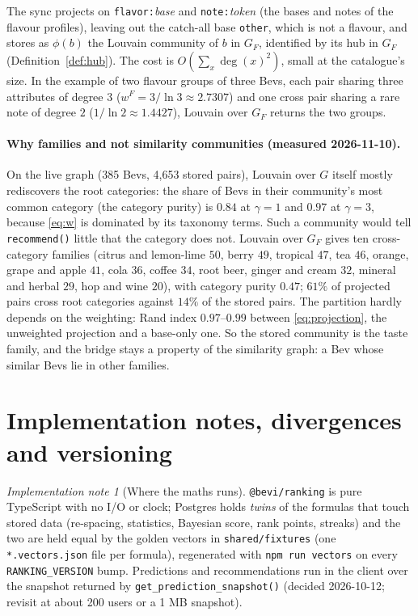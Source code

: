 \documentclass[11pt]{article}
\newcommand{\code}[1]{\texttt{#1}}
\theoremstyle{plain}
\theoremstyle{definition}
\theoremstyle{remark}
\newtheorem{implnote}[theorem]{Implementation note}
\begin{document}
The sync projects on \code{flavor:}\textit{base} and \code{note:}\textit{token} (the bases and notes of the flavour profiles), leaving out the catch-all base \code{other}, which is not a flavour, and stores as $\phi(b)$ the Louvain community of $b$ in $G_F$, identified by its hub in $G_F$ (Definition~\ref{def:hub}). The cost is $O(\sum_x \deg(x)^2)$, small at the catalogue's size. In the example of two flavour groups of three Bevs, each pair sharing three attributes of degree $3$ ($w^F = 3/\ln 3 \approx 2.7307$) and one cross pair sharing a rare note of degree $2$ ($1/\ln 2 \approx 1.4427$), Louvain over $G_F$ returns the two groups.

\paragraph{Why families and not similarity communities (measured 2026-11-10).} On the live graph (385 Bevs, 4{,}653 stored pairs), Louvain over $G$ itself mostly rediscovers the root categories: the share of Bevs in their community's most common category (the category purity) is $0.84$ at $\gamma = 1$ and $0.97$ at $\gamma = 3$, because \eqref{eq:w} is dominated by its taxonomy terms. Such a community would tell \code{recommend()} little that the category does not. Louvain over $G_F$ gives ten cross-category families (citrus and lemon-lime $50$, berry $49$, tropical $47$, tea $46$, orange, grape and apple $41$, cola $36$, coffee $34$, root beer, ginger and cream $32$, mineral and herbal $29$, hop and wine $20$), with category purity $0.47$; $61\%$ of projected pairs cross root categories against $14\%$ of the stored pairs. The partition hardly depends on the weighting: Rand index $0.97$--$0.99$ between \eqref{eq:projection}, the unweighted projection and a base-only one. So the stored community is the taste family, and the bridge stays a property of the similarity graph: a Bev whose similar Bevs lie in other families.

\section{Implementation notes, divergences and versioning}\label{sec:impl}

\begin{implnote}[Where the maths runs]
\code{@bevi/ranking} is pure TypeScript with no I/O or clock; Postgres holds \emph{twins} of the formulas that touch stored data (re-spacing, statistics, Bayesian score, rank points, streaks) and the two are held equal by the golden vectors in \code{shared/fixtures} (one \code{*.vectors.json} file per formula), regenerated with \code{npm run vectors} on every \code{RANKING\_VERSION} bump. Predictions and recommendations run in the client over the snapshot returned by \code{get\_prediction\_snapshot()} (decided 2026-10-12; revisit at about 200 users or a 1 MB snapshot).
\end{implnote}
\end{document}
